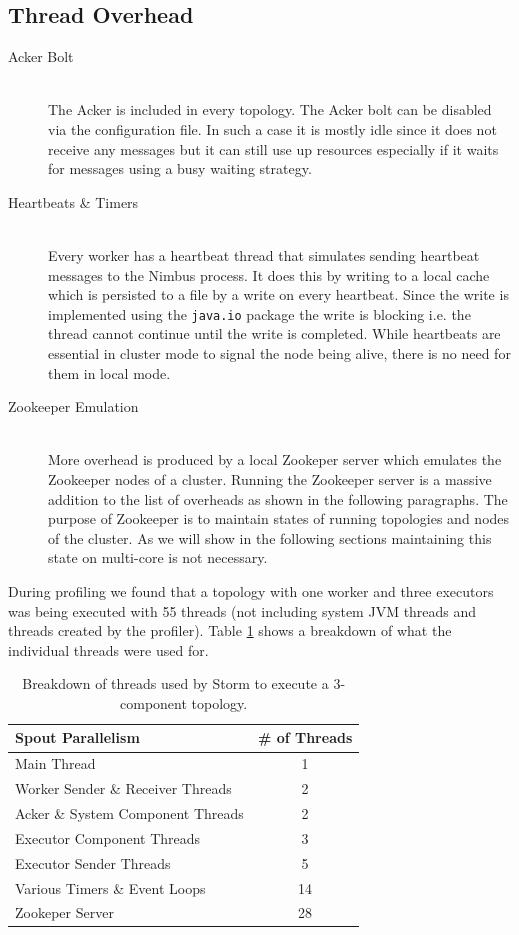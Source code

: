 \documentclass[bsc,logo,frontabs,twoside,singlespacing,normalheadings,parskip]{infthesis}\usepackage[]{graphicx}\usepackage[]{color}
\let\Oldtodo\todo
\renewcommand{\todo}[1]{\Oldtodo[inline]{#1}}
\begin{document}
\subsection{Thread Overhead}

\todo{Maybe mention waiting strategies?}

\begin{description}
	\item[Acker Bolt] \hfill \\
	The Acker is included in every topology. The Acker bolt can be disabled via the configuration file. In such a case it is mostly idle since it does not receive any messages but it can still use up resources especially if it waits for messages using a busy waiting strategy.
	\item[Heartbeats \& Timers] \hfill \\
	Every worker has a heartbeat thread that simulates sending heartbeat messages to the Nimbus process. It does this by writing to a local cache which is persisted to a file by a write on every heartbeat. Since the write is implemented using the \texttt{java.io} package the write is blocking i.e. the thread cannot continue until the write is completed. While heartbeats are essential in cluster mode to signal the node being alive, there is no need for them in local mode.
	\item[Zookeeper Emulation] \hfill \\
	More overhead is produced by a local Zookeper server which emulates the Zookeeper nodes of a cluster. Running the Zookeeper server is a massive addition to the list of overheads as shown in the following paragraphs. The purpose of Zookeeper is to maintain states of running topologies and nodes of the cluster. As we will show in the following sections maintaining this state on multi-core is not necessary.
\end{description}

During profiling we found that a topology with one worker and three executors was being executed with 55 threads (not including system JVM threads and threads created by the profiler). Table \ref{table:breakdown} shows a breakdown of what the individual threads were used for.

\begin{table}[h!]
\centering
\begin{tabular}{@{}lc@{}}
    \textbf{Spout Parallelism} & \textbf{\# of Threads} \\ \toprule
    Main Thread & 1  \\
	Worker Sender \& Receiver Threads & 2  \\
    Acker \& System Component Threads & 2  \\
    Executor Component Threads & 3  \\
    Executor Sender Threads & 5  \\
    Various Timers \& Event Loops & 14  \\
    Zookeper Server & 28  \\
\end{tabular}
\caption{Breakdown of threads used by Storm to execute a 3-component topology.}
\label{table:breakdown}
\end{table}
\end{document}
